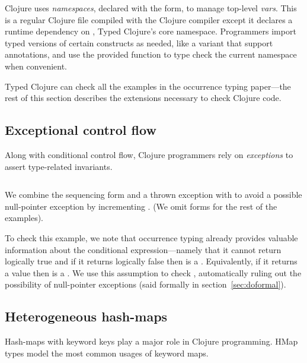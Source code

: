 \begin{exmp}
\inputminted[firstline=1]{clojure}{code/demo/src/demo/eg1.clj}
\end{exmp}

Clojure uses \emph{namespaces}, declared with the
 form, to manage top-level \emph{vars}.
This is a regular Clojure file compiled with
the Clojure compiler except it declares a runtime dependency on
, Typed Clojure's core namespace.
Programmers import typed versions of certain constructs as needed, like
a  variant that support annotations,
and use the provided  function to type check the current namespace
when convenient.

Typed Clojure can check all the examples in the occurrence typing
paper---the rest of this section describes the extensions necessary
to check Clojure code.

\subsection{Exceptional control flow}

Along with conditional control flow,
Clojure programmers rely on \emph{exceptions}
to assert type-related invariants.

\begin{exmp}
\inputminted[firstline=13,lastline=15]{clojure}{code/demo/src/demo/do.clj}
\end{exmp}

We combine the sequencing form  and a thrown exception with
 to avoid a possible null-pointer exception by incrementing .
(We omit  forms for the rest of the examples).

To check this example, we note that
occurrence typing already provides
valuable information about the conditional expression---namely that it cannot return logically true and if it returns logically false 
then  is a . Equivalently, if it returns a value then  is a .
We use this assumption to check , automatically
ruling out the possibility of null-pointer exceptions
(said formally in section~\ref{sec:doformal}).

\subsection{Heterogeneous hash-maps}

Hash-maps with keyword keys play a major role in Clojure programming.
HMap types model the most common usages of keyword maps.

